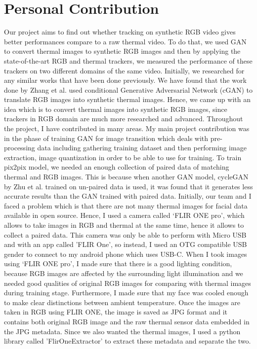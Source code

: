 \documentclass[conference]{IEEEtran}
\begin{document}
\section{Personal Contribution}
Our project aims to find out whether tracking on synthetic RGB video gives better performances compare to a raw thermal video. To do that, we used GAN to convert thermal images to synthetic RGB images and then by applying the state-of-the-art RGB and thermal trackers, we measured the performance of these trackers on two different domains of the same video. Initially, we researched for any similar works that have been done previously. We have found that the work done by Zhang et al.\cite{b5} used conditional Generative Adversarial Network (cGAN) to translate RGB images into synthetic thermal images. Hence, we came up with an idea which is to convert thermal images into synthetic RGB images, since trackers in RGB domain are much more researched and advanced. 
Throughout the project, I have contributed in many areas. My main project contribution was in the phase of training GAN for image transition which deals with pre-processing data including gathering training dataset and then performing image extraction, image quantization in order to be able to use for training. To train pix2pix model, we needed an enough collection of paired data of matching thermal and RGB images. This is because when another GAN model, cycleGAN by Zhu et al.\cite{b4} trained on un-paired data is used, it was found that it generates less accurate results than the GAN trained with paired data. Initially, our team and I faced a problem which is that there are not many thermal images for facial data available in open source. Hence, I used a camera called ‘FLIR ONE pro’, which allows to take images in RGB and thermal at the same time, hence it allows to collect a paired data. This camera was only be able to perform with Micro USB and with an app called ’FLIR One’, so instead, I used an OTG compatible USB gender to connect to my android phone which uses USB-C. 
When I took images using ‘FLIR ONE pro’, I made sure that there is a good lighting condition, because RGB images are affected by the surrounding light illumination and we needed good qualities of original RGB images for comparing with thermal images during training stage. Furthermore, I made sure that my face was cooled enough to make clear distinctions between ambient temperature. Once the images are taken in RGB using FLIR ONE, the image is saved as JPG format and it contains both original RGB image and the raw thermal sensor data embedded in the JPG metadata. Since we also wanted the thermal images, I used a python library called ’FlirOneExtractor’\cite{b16} to extract these metadata and separate the two. 
\end{document}

